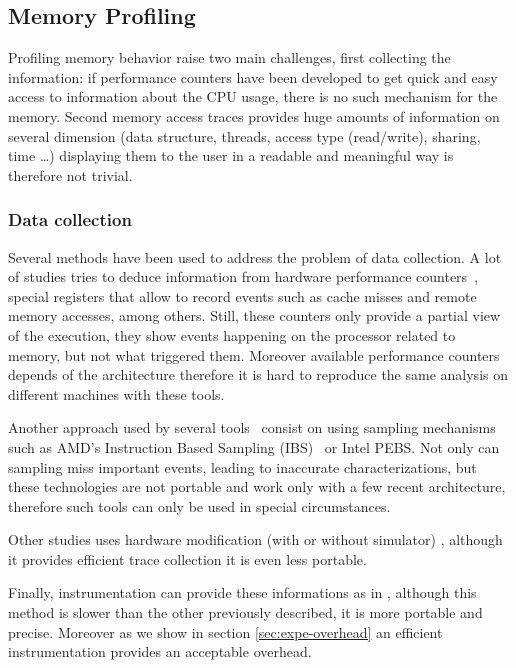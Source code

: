 \subsection{Memory Profiling}
\label{sec:soa-profiling}

Profiling memory behavior raise two main challenges, first collecting the
information: if performance counters have been developed to get quick and
easy access to information about the CPU usage, there is no such mechanism for
the memory. Second memory access traces provides huge amounts of information
on several dimension (data structure, threads, access type (read/write),
sharing, time \ldots) displaying them to the user in a readable and meaningful
way is therefore not trivial.

\subsubsection{Data collection}

Several methods have been used to address the problem of data collection. A
lot of studies tries to deduce information from hardware performance
counters~\cite{Majo13(Mis)understanding,
Jiang14Understanding,Bosch00Rivet,Weyers14Visualization,Tao01Visualizing,DeRose01Hardware},
special registers that allow to record events such as cache misses and remote
memory accesses, among others. Still, these counters only provide a partial
view of the execution, they show events happening on the processor related to
memory, but not what triggered them. Moreover available performance counters
depends of the architecture therefore it is hard to reproduce the same
analysis on different machines with these tools.


Another approach used by several
tools~\cite{Lachaize12MemProf,McCurdy2010,Liu14Tool,Gimenez14Dissecting}
consist on  using sampling mechanisms such as AMD's Instruction Based Sampling
(IBS)~\cite{Drongowski07Instructionbased} or Intel PEBS. Not only can sampling miss important events, leading to
inaccurate characterizations, but these technologies are not portable and work
only with a few recent architecture, therefore such tools can only be used in
special circumstances.

Other studies uses hardware modification (with or without simulator)
\cite{Bao08HMTT,Martonosi92MemSpy}, although it provides efficient trace
collection it is even less portable.


Finally, instrumentation can provide these informations as in
\cite{DeRose02SIGMA,Rozar14Amelioration}, although this method is slower than
the other previously described, it is more portable and precise. Moreover as
we show in section \ref{sec:expe-overhead} an efficient instrumentation
provides an acceptable overhead.

